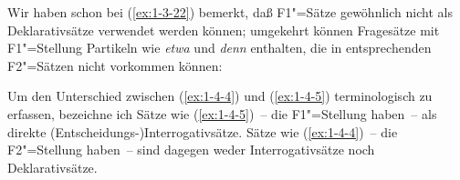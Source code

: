 \documentclass[output=paper]{langsci/langscibook}
\begin{document}
Wir haben schon bei (\ref{ex:1-3-22}) bemerkt, daß F1"=Sätze gewöhnlich nicht als Deklarativsätze verwendet werden können; umgekehrt können Fragesätze mit F1"=Stellung Partikeln wie \emph{etwa} und \emph{denn} enthalten, die in entsprechenden F2"=Sätzen nicht vorkommen können:

\begin{exe}
\ex
\label{ex:1-4-5}
\begin{xlist}
\end{xlist}

\ex\label{ex:1-4-6}
\begin{xlist}
\end{xlist}
\end{exe}
Um den Unterschied zwischen (\ref{ex:1-4-4}) und (\ref{ex:1-4-5})
terminologisch zu erfassen, bezeichne ich Sätze wie
(\ref{ex:1-4-5})~-- die F1"=Stellung haben~-- als direkte
(Entscheidungs-){\allowbreak}Interrogativsätze. Sätze wie
(\ref{ex:1-4-4})~-- die F2"=Stellung haben~-- sind dagegen weder
Interrogativsätze noch Deklarativsätze.
\end{document}
